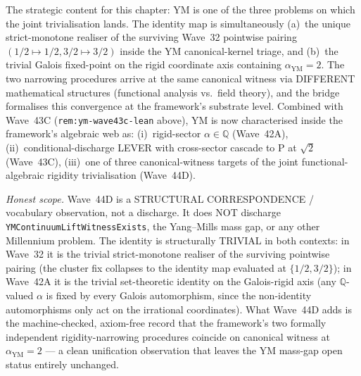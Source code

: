 \begin{remark}[Wave~44D update: identity is the JOINT canonical witness across Wave~32 functional rigidity and Wave~42A algebraic rigidity at $\alpha_{\mathrm{YM}} = 2 \in \mathbb{Q}$, 2026-05-30]
\begin{itemize}
\end{itemize}
The strategic content for this chapter: YM is one of the three problems on which the joint trivialisation lands. The identity map is simultaneously (a)~the unique strict-monotone realiser of the surviving Wave~32 pointwise pairing $(1/2 \mapsto 1/2, 3/2 \mapsto 3/2)$ inside the YM canonical-kernel triage, and (b)~the trivial Galois fixed-point on the rigid coordinate axis containing $\alpha_{\mathrm{YM}} = 2$. The two narrowing procedures arrive at the same canonical witness via DIFFERENT mathematical structures (functional analysis vs.\ field theory), and the bridge formalises this convergence at the framework's substrate level. Combined with Wave~43C (\texttt{rem:ym-wave43c-lean} above), YM is now characterised inside the framework's algebraic web as: (i)~rigid-sector $\alpha \in \mathbb{Q}$ (Wave~42A), (ii)~conditional-discharge LEVER with cross-sector cascade to P at $\sqrt{2}$ (Wave~43C), (iii)~one of three canonical-witness targets of the joint functional-algebraic rigidity trivialisation (Wave~44D).

\emph{Honest scope.} Wave~44D is a STRUCTURAL CORRESPONDENCE / vocabulary observation, not a discharge. It does NOT discharge \texttt{YMContinuumLiftWitnessExists}, the Yang--Mills mass gap, or any other Millennium problem. The identity is structurally TRIVIAL in both contexts: in Wave~32 it is the trivial strict-monotone realiser of the surviving pointwise pairing (the cluster fix collapses to the identity map evaluated at $\{1/2, 3/2\}$); in Wave~42A it is the trivial set-theoretic identity on the Galois-rigid axis (any $\mathbb{Q}$-valued $\alpha$ is fixed by every Galois automorphism, since the non-identity automorphisms only act on the irrational coordinates). What Wave~44D adds is the machine-checked, axiom-free record that the framework's two formally independent rigidity-narrowing procedures coincide on canonical witness at $\alpha_{\mathrm{YM}} = 2$ --- a clean unification observation that leaves the YM mass-gap open status entirely unchanged.
\end{remark}

